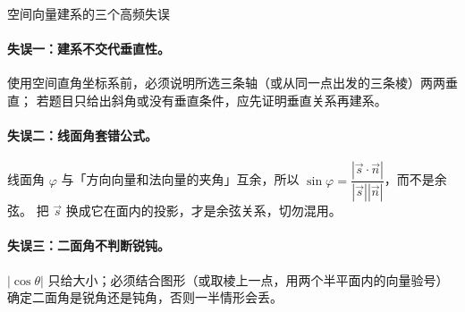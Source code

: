 \begin{explore}
\begin{commonerror}{空间向量建系的三个高频失误}
\paragraph{失误一：建系不交代垂直性。}
使用空间直角坐标系前，必须说明所选三条轴（或从同一点出发的三条棱）两两垂直；
若题目只给出斜角或没有垂直条件，应先证明垂直关系再建系。
\paragraph{失误二：线面角套错公式。}
线面角 $\varphi$ 与「方向向量和法向量的夹角」互余，所以
$\sin\varphi=\dfrac{|\vec s\cdot\vec n|}{|\vec s||\vec n|}$，而不是余弦。
把 $\vec s$ 换成它在面内的投影，才是余弦关系，切勿混用。
\paragraph{失误三：二面角不判断锐钝。}
$|\cos\theta|$ 只给大小；必须结合图形（或取棱上一点，用两个半平面内的向量验号）确定二面角是锐角还是钝角，否则一半情形会丢。
\end{commonerror}

\begin{advancedonly}


\end{advancedonly}
\end{explore}
